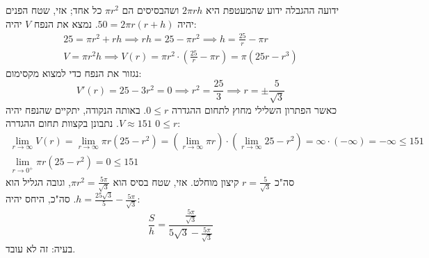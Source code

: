 \documentclass[]{article}
\renewcommand\inf {\infty}
\newcommand\cl [1]    {\left ( #1 \right )}
\begin{document}
\begin{enumerate}
		ידועה ההגבלה ידוע שהמעטפת היא $2\pi r h$ ושהבסיסים הם $\pi r^2$ כל אחד; אזי, שטח הפנים יהיה $50 = 2\pi r(r + h)$. נמצא את הנפח $V$ יהיה: 
		\begin{gather*}
			25 = \pi r^2 + rh \implies rh = 25 - \pi r^2 \implies h = \frac{25}{r} - \pi r \\
			V = \pi r^2 h \implies V(r) = \pi r^2 \cdot \cl{\frac{25}{r} - \pi r} = \pi \cl{25 r - r^3}
		\end{gather*}
		נגזור את הנפח כדי למצוא מקסימום: 
		\[ V'(r) = 25 - 3r^2 = 0 \implies r^2 = \frac{25}{3} \implies r = \pm \frac{5}{\sqrt 3} \]
		כאשר הפתרון השלילי מחוץ לתחום ההגדרה $0 \le r$. באותה הנקודה, יתקיים שהנפח יהיה $V \approx 151$. נתבונן בקצוות תחום ההגדרה $0 \le r$: 
		\begin{gather*}
			\lim_{r \to \inf} V(r) = \lim_{r \to \inf} \pi r(25 - r^2) = \cl{\lim_{r \to \inf} \pi r} \cdot \cl{\lim_{r \to \inf} 25 - r^2} = \inf \cdot (-\inf) = -\inf \le 151 \\
			\lim_{r \to 0^+} \pi r (25 - r^2) = 0 \le 151
		\end{gather*}
		סה"כ $r = \frac{5}{\sqrt3}$ קיצון מוחלט. אזי, שטח בסיס הוא $\pi r^2 = \frac{5\pi}{\sqrt 3}$, וגובה הגליל הוא $h = \frac{25\sqrt 3}{5} - \frac{5 \pi}{\sqrt 3}$. סה"כ, היחס יהיה: 
		\[ \frac{S}{h} = \frac{\frac{5\pi}{\sqrt 3}}{5 \sqrt3 - \frac{5\pi}{\sqrt3}} \]
		בעיה: זה לא עובד. 
		
		
	\end{enumerate}
	\section{}
	
\end{document}
